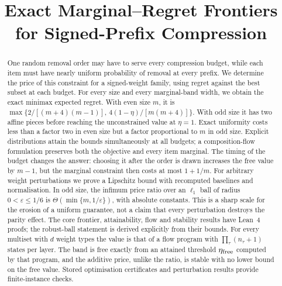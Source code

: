 



\title{Exact Marginal--Regret Frontiers\\for Signed-Prefix Compression}

\author{
}

\maketitle

\begin{abstract}
One random removal order may have to serve every compression budget, while each item must
have nearly uniform probability of removal at every prefix. We determine the price of this
constraint for a signed-weight family, using regret against the best subset at each budget.
For every size and every marginal-band width, we obtain the exact minimax expected regret.
With even size $m$, it is
$\max\{2/[(m+4)(m-1)],\,4(1-\eta)/[m(m+4)]\}$.
With odd size it has two affine pieces before reaching the unconstrained value at $\eta=1$.
Exact uniformity costs less than a factor two in even size but a factor proportional to $m$
in odd size. Explicit distributions attain the bounds simultaneously at all budgets; a
composition-flow formulation preserves both the objective and every item marginal.
The timing of the budget changes the answer: choosing it after the order is drawn increases
the free value by $m-1$, but the marginal constraint then costs at most $1+1/m$.
For arbitrary weight perturbations we prove a Lipschitz bound with recomputed baselines and
normalisation. In odd size, the infimum price ratio over an $\ell_1$ ball of radius
$0<\varepsilon\le1/6$ is $\Theta(\min\{m,1/\varepsilon\})$, with absolute constants.
This is a sharp scale for the erosion of a uniform guarantee, not a claim that every
perturbation destroys the parity effect. The core frontier, attainability, flow and stability
results have Lean~4 proofs; the robust-ball statement is derived explicitly from their bounds.
For every multiset with $d$ weight types the value is that of a flow program with
$\prod_\tau(n_\tau+1)$ states per layer. The band is free exactly from an attained threshold
$\eta_{\rm free}$ computed by that program, and the additive price, unlike the ratio, is stable
with no lower bound on the free value.
Stored optimisation certificates and perturbation results provide finite-instance checks.
\end{abstract}

